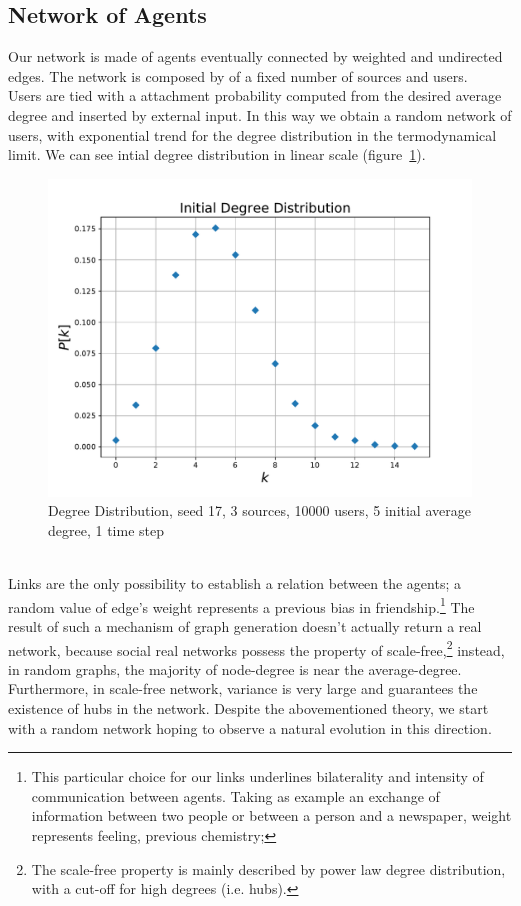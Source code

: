 \subsection{Network of Agents}\label{subsec:network}
Our network is made of agents eventually connected by weighted and
undirected edges. The network is composed by of a fixed number of
sources and users.\\
Users are tied with a attachment probability computed from the desired average
degree and inserted by external input. In this way we obtain a random
network of users, with exponential trend for the degree distribution in
the termodynamical limit. We can see intial degree distribution in linear scale 
(figure~\ref{fig:gauss}).
%
\begin{figure}[!h]
  \centering
  \includegraphics[width=.7\columnwidth]{img/pdf/gauss.pdf}
  \caption{Degree Distribution, seed 17, 3 sources, 10000 users, 5 initial average degree, 1 time step}
  \label{fig:gauss}
\end{figure}
%
\\
Links are the only possibility to establish a relation between the agents;
a random value of edge's weight represents a previous bias in
friendship.\footnote{This particular choice for our links underlines
  bilaterality and intensity of communication between agents. Taking
  as example an exchange of information between two people or between a
  person and a newspaper, weight represents feeling, previous chemistry;}
The result of such a mechanism of graph generation doesn't actually return
a real network, because social real networks possess the property of 
scale-free,\footnote{The scale-free property is mainly described by power
  law degree distribution, with a cut-off for high degrees (i.e. hubs). }
instead, in random graphs, the majority of node-degree is near the
average-degree.
Furthermore, in scale-free network, variance is very large and guarantees
the existence of hubs in the network.\cite{newman1963introduction}
Despite the abovementioned theory, we start with a random network hoping
to observe a natural evolution in this direction.

